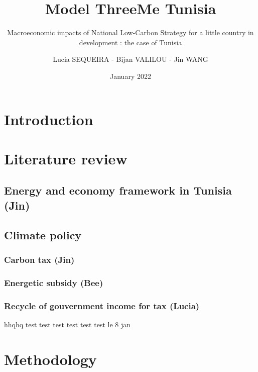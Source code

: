 \documentclass[
]{article}
\title{Model ThreeMe Tunisia}
\subtitle{Macroeconomic impacts of National Low-Carbon Strategy for a
little country in development : the case of Tunisia}
\author{Lucia SEQUEIRA - Bijan VALILOU - Jin WANG}
\date{January 2022}
\begin{document}
\maketitle

{
\setcounter{tocdepth}{2}
\tableofcontents
}
\newpage

\hypertarget{introduction}{%
\section{Introduction}\label{introduction}}

\hypertarget{literature-review}{%
\section{Literature review}\label{literature-review}}

\hypertarget{energy-and-economy-framework-in-tunisia-jin}{%
\subsection{Energy and economy framework in Tunisia
(Jin)}\label{energy-and-economy-framework-in-tunisia-jin}}

\hypertarget{climate-policy}{%
\subsection{Climate policy}\label{climate-policy}}

\hypertarget{carbon-tax-jin}{%
\subsubsection{Carbon tax (Jin)}\label{carbon-tax-jin}}

\hypertarget{energetic-subsidy-bee}{%
\subsubsection{Energetic subsidy (Bee)}\label{energetic-subsidy-bee}}

\hypertarget{recycle-of-gouvernment-income-for-tax-lucia}{%
\subsubsection{Recycle of gouvernment income for tax
(Lucia)}\label{recycle-of-gouvernment-income-for-tax-lucia}}

hhqhq test test test test test test le 8 jan

\hypertarget{methodology}{%
\section{Methodology}\label{methodology}}
\end{document}

